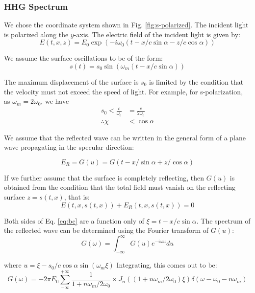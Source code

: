 \documentclass[12pt]{article}
\begin{document}
\subsubsection{HHG Spectrum}
We chose the coordinate system shown in Fig. \ref{fig:s-polarized}. The incident light is polarized along the $y$-axis. The electric field of the incident light is given by:
\begin{equation*}
    E(t, x, z) = E_0 \exp\left(-i\omega_0\left(t-x/c \sin\alpha - z/c \cos\alpha\right)\right)
\end{equation*}

We assume the surface oscillations to be of the form:
\begin{equation*}
    s(t) = s_0 \sin\left( \omega_m \left(t - x/c \sin\alpha\right) \right)
\end{equation*}

The maximum displacement of the surface is $s_0$ is limited by the condition that the velocity must not exceed the speed of light. For example, for s-polarization, as $\omega_m = 2 \omega_0$, we have
\begin{align*}
    s_0 < \frac{c}{\omega_0} & = \frac{c}{2\omega_0} \\
    \therefore \chi          & < \cos\alpha
\end{align*}

We assume that the reflected wave can be written in the general form of a plane wave propagating in the specular direction:

\begin{equation*}
    E_R = G(u) = G(t - x/\sin\alpha + z/\cos\alpha)
\end{equation*}

If we further assume that the surface is completely reflecting, then $G(u)$ is obtained from the condition that the total field must vanish on the reflecting surface $z = s(t,x)$, that is:
\begin{equation}
    \label{eq:bc}
    E(t,x,s(t,x)) + E_R(t,x,s(t,x)) = 0
\end{equation}

Both sides of Eq. \ref{eq:bc} are a function only of $\xi = t - x/c \sin\alpha$. The spectrum of the reflected wave can be determined using the Fourier transform of $G(u)$:
\begin{equation*}
    G(\omega) = \int_{-\infty}^{\infty} G(u) e^{-i\omega u} du
\end{equation*}

where $u = \xi - s_0/c \cos\alpha \sin(\omega_m \xi)$ Integrating, this comes out to be:
\begin{equation}
    \label{eq:G_omega}
    G(\omega) = -2 \pi E_0 \sum_{-\infty}^{+\infty} \frac{1}{1+ n\omega_m /2 \omega_0} \times J_n \left(\left( 1+ n\omega_m /2\omega_0\right)\xi\right)\delta \left(\omega - \omega_0 - n\omega_m\right)
\end{equation}
\end{document}
